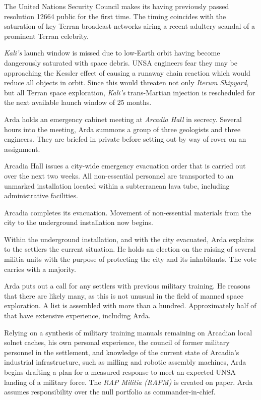 The United Nations Security Council makes its having previously passed resolution 12664 public for the first time. The timing coincides with the saturation of key Terran broadcast networks airing a recent adultery scandal of a prominent Terran celebrity.
\StopTimelineDate

{\it Kali's} launch window is missed due to low-Earth orbit having become dangerously saturated with space debris. UNSA engineers fear they may be approaching the Kessler effect of causing a runaway chain reaction which would reduce all objects in orbit. Since this would threaten not only {\it Iterum Shipyard}, but all Terran space exploration, {\it Kali's} trans-Martian injection is rescheduled for the next available launch window of 25 months.
\StopTimelineDate

Arda holds an emergency cabinet meeting at {\it Arcadia Hall} in secrecy. Several hours into the meeting, Arda summons a group of three geologists and three engineers. They are briefed in private before setting out by way of rover on an assignment.
\StopTimelineDate

Arcadia Hall issues a city-wide emergency evacuation order that is carried out over the next two weeks. All non-essential personnel are transported to an unmarked installation located within a subterranean lava tube, including administrative facilities.
\StopTimelineDate

Arcadia completes its evacuation. Movement of non-essential materials from the city to the underground installation now begins.

Within the underground installation, and with the city evacuated, Arda explains to the settlers the current situation. He holds an election on the raising of several militia units with the purpose of protecting the city and its inhabitants. The vote carries with a majority.

Arda puts out a call for any settlers with previous military training. He reasons that there are likely many, as this is not unusual in the field of manned space exploration. A list is assembled with more than a hundred. Approximately half of that have extensive experience, including Arda.
\StopTimelineDate

Relying on a synthesis of military training manuals remaining on Arcadian local solnet caches, his own personal experience, the council of former military personnel in the settlement, and knowledge of the current state of Arcadia's industrial infrastructure, such as milling and robotic assembly machines, Arda begins drafting a plan for a measured response to meet an expected UNSA landing of a military force. The {\it RAP Militia (RAPM)} is created on paper. Arda assumes responsibility over the null portfolio as commander-in-chief.

